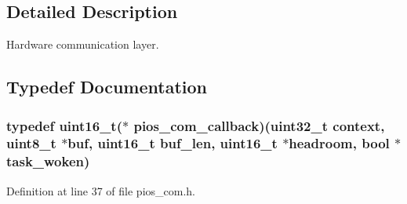 \subsection{\-Detailed \-Description}
\-Hardware communication layer. 

\subsection{\-Typedef \-Documentation}
\hypertarget{group___p_i_o_s___c_o_m_ga23f1888821f1f74a50c02adc459df597}{
\subsubsection[{pios\-\_\-com\-\_\-callback}]{\setlength{\rightskip}{0pt plus 5cm}typedef uint16\-\_\-t($\ast$ {\bf pios\-\_\-com\-\_\-callback})(uint32\-\_\-t context, uint8\-\_\-t $\ast$buf, uint16\-\_\-t buf\-\_\-len, uint16\-\_\-t $\ast$headroom, bool $\ast$task\-\_\-woken)}}\label{group___p_i_o_s___c_o_m_ga23f1888821f1f74a50c02adc459df597}


\-Definition at line 37 of file pios\-\_\-com.\-h.



